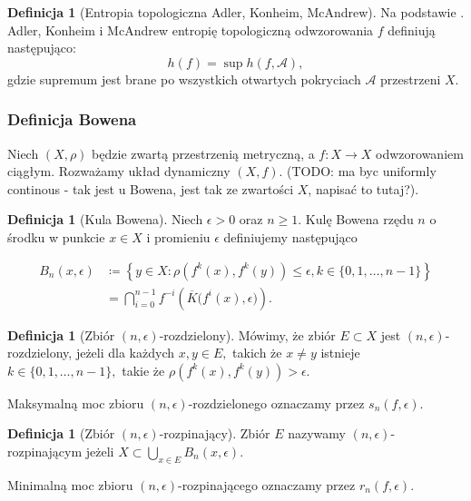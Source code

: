 \documentclass[licencjacka]{pwr_wmat_praca_dyplomowa}
\theoremstyle{plain}
\numberwithin{theorem}{chapter}
\theoremstyle{definition}
\numberwithin{theorem}{chapter}
\newtheorem{definition}[theorem]{Definicja}
\begin{document}
\begin{definition}[Entropia topologiczna Adler, Konheim, McAndrew]
\label{definicja_entropii_topologicznej_adlera}
Na podstawie \cite{misiurewicz1993}.
Adler, Konheim i McAndrew entropię topologiczną odwzorowania $f$ definiują następująco: 
$$h(f) = \sup h(f, \mathcal{A}),$$ gdzie supremum jest brane po wszystkich otwartych pokryciach $\mathcal{A}$ przestrzeni $X$.
\end{definition}


\subsubsection{Definicja Bowena}

Niech $(X, \rho)$ będzie zwartą przestrzenią metryczną, a $f: X \rightarrow X$ odwzorowaniem ciągłym. Rozważamy układ dynamiczny $(X, f).$ {\color{red}(TODO: ma byc uniformly continous - tak jest u Bowena, jest tak ze zwartości $X$, napisać to tutaj?)}.

\begin{definition}[Kula Bowena]
\cite[s.~58]{ruette2017chaos}
Niech  $\epsilon > 0$ oraz $n \geq 1$. Kulę Bowena rzędu $n$ o środku w punkcie $x \in X$ i promieniu $\epsilon$ definiujemy następująco

\begin{equation}
\begin{aligned}
B_n(x,\epsilon) & \coloneqq \left\{y \in X : \rho\left(f^k(x), f^k(y)\right) \leq \epsilon, k \in \{0, 1, \ldots, n-1\}\right\} \\
& = \bigcap_{i=0}^{n-1}f^{-i}\left(\overline{K}\big(f^i(x), \epsilon\big)\right).
\end{aligned}
\end{equation}

\end{definition} 


\begin{definition}[Zbiór $(n,\epsilon)$-rozdzielony]
\label{definicja_n_eps_rozdzielonego}
\cite[s.~58]{ruette2017chaos}
Mówimy, że zbiór $E \subset X$ jest $(n, \epsilon)$-rozdzielony, jeżeli dla każdych $x, y \in E,$ takich że $x \neq y$ istnieje $k \in \{0, 1, \ldots, n-1\},$ takie że $\rho\left(f^k(x), f^k(y)\right) > \epsilon.$

Maksymalną moc zbioru $(n, \epsilon)$-rozdzielonego oznaczamy przez $s_n(f, \epsilon).$
\end{definition}


\begin{definition}[Zbiór $(n, \epsilon)$-rozpinający]
\cite[s.~58]{ruette2017chaos}
Zbiór $E$ nazywamy $(n,\epsilon)$-rozpinającym jeżeli $X \subset \bigcup_{x \in E}B_n(x, \epsilon)$.

Minimalną moc zbioru $(n, \epsilon)$-rozpinającego oznaczamy przez $r_n(f, \epsilon).$

\end{definition}
\end{document}
